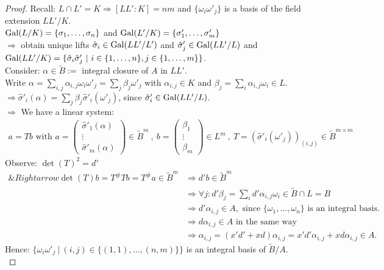 \begin{proof}
Recall: $L \cap L' =K \Rightarrow [LL' :K]=nm$ and $\{\omega_i\omega'_j\}$ is a basis of the field extension $LL' / K$.\\
$\operatorname{Gal}(L/K)=\{\sigma_1, \dots, \sigma_n\}$ and $\operatorname{Gal}(L'/K) = \{\sigma'_1, \dots, \sigma'_m\}$\\
$\Rightarrow$ obtain unique lifts $\hat{\sigma}_i \in \operatorname{Gal}(LL'/L')$ and $\hat{\sigma}'_j \in \operatorname{Gal}(LL'/L)$ and $\Gal(LL'/K)=\{\hat{\sigma}_i \hat{\sigma}'_j \ | \ i \in \{1, \dots, n \}, j \in \{1, \dots, m\}\}$.\\
Consider: $\alpha \in \tilde{B}:= $ integral closure of $A$ in $LL'$.\\
Write $\alpha = \sum_{i,j} \alpha_{i,j} \omega_i \omega'_j = \sum_j \beta_j \omega'_j$ with $\alpha_{i,j} \in K$ and $\beta_j= \sum_i \alpha_{i,j} \omega_i \in L$.\\
$\Rightarrow \hat{\sigma}'_i(\alpha) = \sum_j \beta_j \hat{\sigma}'_i(\omega'_j)$, since $\hat{\sigma}'_i \in \operatorname{Gal}(LL'/L)$.\\
$\Rightarrow$ We have a linear system:
\begin{align*}
a=Tb \text{ with } a = \begin{pmatrix}
\hat{\sigma}'_1(\alpha)\\
\vdots\\
\hat{\sigma}'_m(\alpha)
\end{pmatrix}
\in \tilde{B}^m \ , \ b = \begin{pmatrix}
\beta_1\\
\vdots\\
\beta_m
\end{pmatrix} \in L^m
\ ,\ T=(\hat{\sigma}'_i(\omega'_j))_{(i,j)} \in \tilde{B}^{m \times m}
\end{align*}
Observe: $\det(T)^2 = d'$
\begin{align*}
\&Rightarrow \det(T) b = T^{\#} T b = T^{\#}a \in \tilde{B}^m &\Rightarrow d'b \in \tilde{B}^m\\
&\Rightarrow \forall j: d' \beta_j = \sum_i d'\alpha_{i,j} \omega_i \in \tilde{B} \cap L =B\\
&\Rightarrow d' \alpha_{i,j} \in A, \text{ since } \{\omega_1, \dots, \omega_n\} \text{ is an integral basis}.\\
&\Rightarrow d\alpha_{i,j} \in A \text{ in the same way}\\
&\Rightarrow \alpha_{i,j} = (x'd'+xd) \alpha_{i,j}=x'd'\alpha_{i,j}+xd\alpha_{i,j} \in A.
\end{align*}
Hence: $\{\omega_i \omega'_j \ | \ (i,j) \in \{(1,1), \dots, (n,m)\}\}$ is an integral basis of $\tilde{B}/A$.\\

\end{proof}
